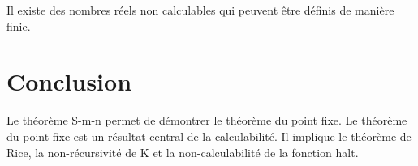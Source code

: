 \begin{myprop}
	Il existe des nombres réels non calculables qui peuvent être définis de
	manière finie.
\end{myprop}


\section{Conclusion}

Le théorème S-m-n permet de démontrer le théorème du point fixe.
Le théorème du point fixe est un résultat central de la calculabilité. Il
implique le théorème de Rice, la non-récursivité de K et la non-calculabilité
de la fonction halt.


